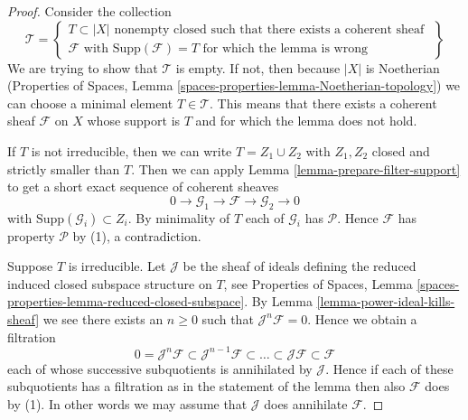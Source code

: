 \documentclass[10pt,a4paper]{amsart}
\theoremstyle{plain}
\theoremstyle{definition}
\theoremstyle{remark}
\numberwithin{equation}{subsection}
\begin{document}
\begin{proof}
Consider the collection
$$
\mathcal{T} =
\left\{
\begin{matrix}
T \subset |X|
\text{ nonempty closed such that there exists a coherent sheaf } \\
\mathcal{F}
\text{ with }
\text{Supp}(\mathcal{F}) = T
\text{ for which the lemma is wrong}
\end{matrix}
\right\}
$$
We are trying to show that $\mathcal{T}$ is empty. If not, then
because $|X|$ is Noetherian (Properties of Spaces, Lemma
\ref{spaces-properties-lemma-Noetherian-topology})
we can choose a minimal element $T \in \mathcal{T}$. This means that
there exists a coherent sheaf $\mathcal{F}$ on $X$ whose support is $T$
and for which the lemma does not hold.

\medskip\noindent
If $T$ is not irreducible, then we can write $T = Z_1 \cup Z_2$
with $Z_1, Z_2$ closed and strictly smaller than $T$.
Then we can apply Lemma \ref{lemma-prepare-filter-support}
to get a short exact sequence of coherent sheaves
$$
0 \to
\mathcal{G}_1 \to
\mathcal{F} \to
\mathcal{G}_2 \to 0
$$
with $\text{Supp}(\mathcal{G}_i) \subset Z_i$. By minimality of
$T$ each of $\mathcal{G}_i$ has $\mathcal{P}$. Hence $\mathcal{F}$
has property $\mathcal{P}$ by (1), a contradiction.

\medskip\noindent
Suppose $T$ is irreducible. Let $\mathcal{J}$ be the sheaf of ideals
defining the reduced induced closed subspace structure on $T$,
see Properties of Spaces, Lemma
\ref{spaces-properties-lemma-reduced-closed-subspace}.
By Lemma \ref{lemma-power-ideal-kills-sheaf} we see there exists
an $n \geq 0$ such that $\mathcal{J}^n\mathcal{F} = 0$. Hence we obtain
a filtration
$$
0 = \mathcal{J}^n\mathcal{F} \subset \mathcal{J}^{n - 1}\mathcal{F}
\subset \ldots \subset \mathcal{J}\mathcal{F} \subset \mathcal{F}
$$
each of whose successive subquotients is annihilated by $\mathcal{J}$.
Hence if each of these subquotients has a filtration as in the statement
of the lemma then also $\mathcal{F}$ does by (1). In other words we may
assume that $\mathcal{J}$ does annihilate $\mathcal{F}$.


\end{proof}
\end{document}
